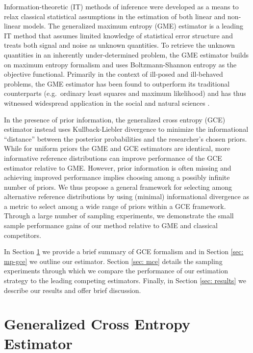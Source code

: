 \documentclass{elsarticle}
\begin{document}
Information-theoretic (IT) methods of inference were developed as a means to
relax classical statistical assumptions in the estimation of both linear and 
non-linear models.
The generalized maximum entropy (GME) estimator is a leading IT method 
that assumes limited knowledge of statistical error structure and treats both
signal and noise as unknown quantities.
To retrieve the unknown quantities in an inherently under-determined problem, 
the GME estimator builds on maximum entropy formalism \citep{jaynes1957a,
 jaynes1957b} 
and uses Boltzmann-Shannon entropy \citep{shannon1948} as the objective 
functional.
Primarily in the context of ill-posed and ill-behaved problems, the GME 
estimator has been found to outperform its traditional counterparts 
(e.g.\ ordinary least squares and maximum likelihood) and has thus
witnessed widespread application in the social and natural sciences 
\citep{golan1996}. 

In the presence of prior information, the generalized cross entropy (GCE) 
estimator instead uses Kullback-Liebler divergence \citep{kullback1951} 
to minimize the informational ``distance'' between the posterior 
probabilities and the researcher's chosen priors.
While for uniform priors the GME and GCE estimators are identical,  
more informative reference distributions can improve performance of the 
GCE estimator relative to GME. 
However, prior information is often missing and achieving improved 
performance implies choosing among a possibly infinite number of priors.
We thus propose a general framework for selecting among alternative 
reference distributions by using (minimal) informational divergence as a 
metric to select among a wide range of priors within a GCE framework.
Through a large number of sampling experiments, we demonstrate the 
small sample performance gains of our method relative to GME and 
classical competitors.

In Section \ref{sec: gce} we provide a brief summary of GCE formalism and 
in Section \ref{sec: mp-gce} we outline our estimator. 
Section \ref{sec: mce} details the sampling experiments through which we 
compare the performance of our estimation strategy to the leading competing 
estimators. 
Finally, in Section \ref{sec: results} we describe our results and offer 
brief discussion.


\section{Generalized Cross Entropy Estimator}
\label{sec: gce}
\end{document}

